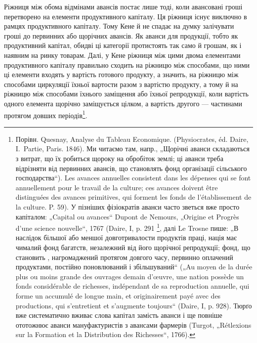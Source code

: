 Ріжниця між обома відмінами авансів постає лише тоді, коли авансовані
гроші перетворено на елементи продуктивного капіталу. Ця ріжниця
існує виключно в рамцях продуктивного капіталу. Тому Кене й не спадає
на думку залічувати гроші до первинних або щорічних авансів. Як аванси
для продукції, тобто як продуктивний капітал, обидві ці категорії протистоять
так само й грошам, як і наявним на ринку товарам. Далі, у Кене
ріжниця між цими двома елементами продуктивного капіталу правильно
сходить на ріжницю між способами, що ними ці елементи входять у вартість
готового продукту, а значить, на ріжницю між способами циркуляції
їхньої вартости разом з вартістю продукту, а тому й на ріжницю
між способами їхнього заміщення або їхньої репродукції, коли вартість
одного елемента щорічно заміщується цілком, а вартість другого — частинами
протягом довших періодів\footnote{
Порівн. Quesnay, Analyse du Tableau Economique. (Physiocrates, éd. Daire,
I.~Partie, Paris. 1846). Ми читаємо там, напр., „Щорічні аванси складаються з витрат,
що їх робиться щороку на обробіток землі; ці аванси треба відрізняти від первинних
авансів, що становлять фонд організації сільського господарства“). Les
avances annuelles consistent dans les dépenses qui se font annuellement pour le
travail de la culture; ces avances doivent être distinguées des avances primitives,
qui forment les fonds de l’établissement de la culture. P. 59). У пізніших фізіократів
аванси часто зветься вже просто капіталом: „Capital ou avances“ Dupont de
Nemours, „Origine et Progrès d’une science nouvelle“, 1767 (Daire, I, p. 291 \footnote*{
Цитоване місце є не в статті „Origine et Progrès“, 1767 (Daire, I, p. 291),
a в статті „Maximes du docteur Quesnay“ (Daire, I, p. 391). \emph{Ред.}
},
далі Le Trosne пише: „В наслідок більшої або меншої довготривалости продуктів
праці, нація має чималий фонд багатств, незалежний від його щорічної
репродукції; фонд, що становить , нагромаджений протягом довгого
часу, первинно оплачений продуктами, постійно поновлюваний і збільшуваний“
(„Au moyen de la durée plus ou moins grande des ouvrages demain d'œuvre, une
nation possède un fonds considérable de richesses, indépendant de sa reproduction
annuelle, qui forme un  accumulé de longue main, et originairement payé
avec des productions, qui s'entretient et s’augmente toujours“ (Daire, I, p. 928).
Тюрґо вже систематично вживає слова капітал замість аванси і ще повніше ототожнює
аванси мануфактуристів з авансами фармерів (Turgot, „Rétlexions sur la
Formation et la Distribution des Richesses“, 1766).
}.

